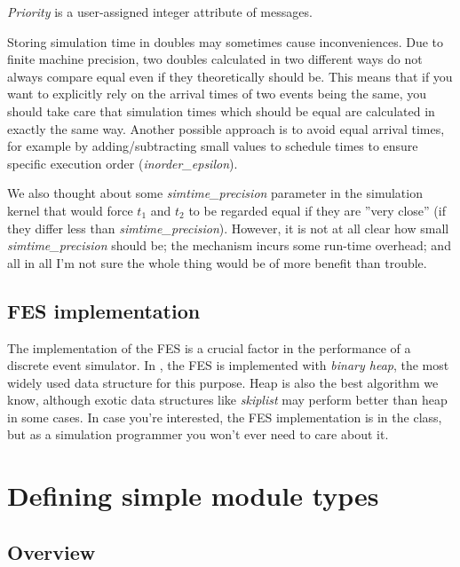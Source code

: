 \textit{Priority} is a user-assigned integer
attribute of messages.

Storing simulation time in doubles may sometimes cause inconveniences.
Due to finite machine precision, two doubles calculated in two
different ways do not always compare equal even if they theoretically
should be. This means that if you want to explicitly rely on the
arrival times of two events being the same, you should take care that
simulation times which should be equal are calculated in exactly the
same way. Another possible approach is to avoid equal arrival times,
for example by adding/subtracting small values to schedule times to
ensure specific execution order
(\textit{inorder\_epsilon}).



We also thought about some \textit{simtime\_precision} parameter in 
the simulation kernel that would force $t_{1}$ and $t_{2}$ to be regarded 
equal if they are ''very close'' (if they differ 
less than \textit{simtime\_precision}). However, it is not at all clear 
how small \textit{simtime\_precision} should be; the mechanism incurs 
some run-time overhead; and all in all I'm not sure the whole 
thing would be of more benefit than trouble.





\subsection{FES implementation}

The implementation of the FES is a crucial factor in the
performance of a discrete event simulator. In {\opp}, the FES is
implemented with \textit{binary heap}, the most
widely used data structure for this purpose. Heap is also the best
algorithm we know, although exotic data structures like
\textit{skiplist} may perform better than heap in some
cases. In case you're interested, the FES implementation is in the
 class, but as a simulation programmer you won't
ever need to care about it.





\section{Defining simple module types}

\subsection{Overview}

